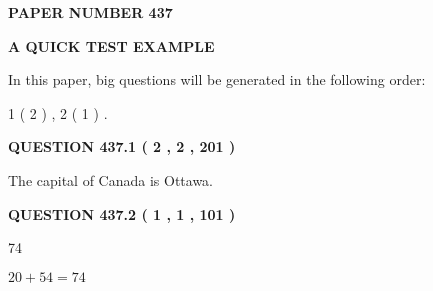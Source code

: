\documentclass[12pt]{article}
\begin{document}
   
   
   
\newpage 
\setcounter{page}{ 
   437001 } 
   
   
   
   
 {\textbf{ \Large{ PAPER NUMBER  437  }}}
   
   
\vspace{0.2in}
   
   
   
   
   
   
 \vspace{0.2in}
{\LARGE {\textbf{ A QUICK TEST EXAMPLE}}}
   
   
   
\vspace{0.2in}
   
In this paper, big questions will be generated in the following order: 
   
   
   1 ( 2 )
 ,
   2 ( 1 )
 .
  
\vspace{0.2in}
  
{\textbf{\Large{QUESTION
437.1 
 ( 2 , 2 , 201 )
}}}
  
  
 
 
\noindent{}
 
 
The capital of Canada is Ottawa.
 
 
 
 
  
\vspace{0.2in}
  
{\textbf{\Large{QUESTION
437.2 
 ( 1 , 1 , 101 )
}}}
  
  
 
 
\noindent{}

74
 
 
 
 
\noindent{}

$ %
20 +  %
54=   %
74$
 
 
   
   
 \vspace{0.2in}
 
   
   
   
   
\end{document}
